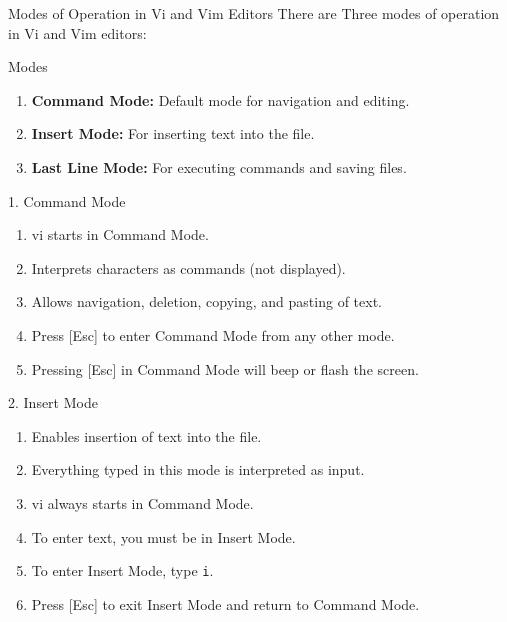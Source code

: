 \documentclass[aspectratio=169]{beamer}
\begin{document}
\begin{frame}{Modes of Operation in Vi and Vim Editors}
    There are Three modes of operation in Vi and Vim editors:
    \begin{block}{Modes}
        \begin{enumerate}
            \item \textbf{Command Mode:} Default mode for navigation and editing.
            \item \textbf{Insert Mode:} For inserting text into the file.
            \item \textbf{Last Line Mode:} For executing commands and saving files.
        \end{enumerate}
    \end{block}
    
\end{frame}

\begin{frame}{1. Command Mode}
    \begin{enumerate}
        \item vi starts in Command Mode.
        \item Interprets characters as commands (not displayed).
        \item Allows navigation, deletion, copying, and pasting of text.
        \item Press [Esc] to enter Command Mode from any other mode.
        \item Pressing [Esc] in Command Mode will beep or flash the screen.
    \end{enumerate}
\end{frame}


\begin{frame}{2. Insert Mode}
    \begin{enumerate}
        \item Enables insertion of text into the file.
        \item Everything typed in this mode is interpreted as input.
        \item vi always starts in Command Mode.
        \item To enter text, you must be in Insert Mode.
        \item To enter Insert Mode, type \texttt{i}.
        \item Press [Esc] to exit Insert Mode and return to Command Mode.
    \end{enumerate}    
\end{frame}
\end{document}
